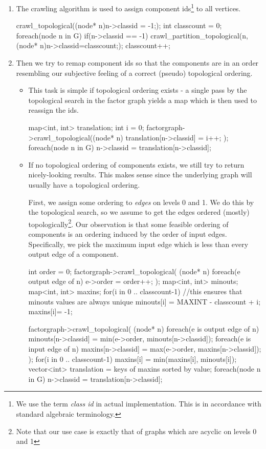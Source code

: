 \begin{enumerate}
  \item The crawling algorithm is used to assign component ids\footnote{We use the term \emph{class id} in actual implementation. This is in accordance with standard algebraic terminology.} to all vertices. 
\begin{code}
crawl_topological((node* n){n->classid = -1;});
int classcount = 0;
foreach(node n in G)
  if(n->classid == -1)
  {
    crawl_partition_topological(n, (node* n){n->classid=classcount;});
    classcount++;
  }
\end{code}
  \item Then we try to remap component ids so that the components are in an order resembling our subjective feeling of a correct (pseudo) topological ordering. 
    \begin{itemize}

      \item This task is simple if topological ordering exists - a single pass by the topological search in the factor graph yields a map which is then used to reassign the ids. 
\begin{code}
map<int, int> translation;
int i = 0;
factorgraph->crawl_topological((node* n){
  translation[n->classid] = i++;
});
foreach(node n in G)
  n->classid = translation[n->classid];
\end{code}


      \item If no topological ordering of components exists, we still try to return nicely-looking results. This makes sense since the underlying graph will usually have a topological ordering. 
        
        First, we assign some ordering to \emph{edges} on levels 0 and 1. We do this by the topological search, so we assume to get the edges ordered (mostly) topologically\footnote{Note that our use case is exactly that of graphs which are acyclic on levels 0 and 1}. Our observation is that some feasible ordering of components is an ordering induced by the order of input edges. Specifically, we pick the  maximum input edge which is less than every output edge of a component.

\begin{code}
int order = 0;
factorgraph->crawl_topological(
  (node* n){ 
    foreach(e output edge of n) 
      e->order = order++;
  }
);
map<int, int> minouts;
map<int, int> maxins;
for(i in 0 .. classcount-1) 
{
  //this ensures that minouts values are always unique
  minouts[i] = MAXINT - classcount + i;
  maxins[i]= -1;
} 
\end{code} 
\begin{code}
factorgraph->crawl_topological(
  (node* n){
    foreach(e is output edge of n)
      minouts[n->classid] = min(e->order, minouts[n->classid]);
    foreach(e is input edge of n)
      maxins[n->classid] = max(e->order, maxins[n->classid]);
  }
); 
for(i in 0 .. classcount-1)
  maxins[i] = min(maxins[i], minouts[i]);
vector<int> translation = keys of maxins sorted by value;
foreach(node n in G)
  n->classid = translation[n->classid];
\end{code}
\end{itemize}



\end{enumerate}

